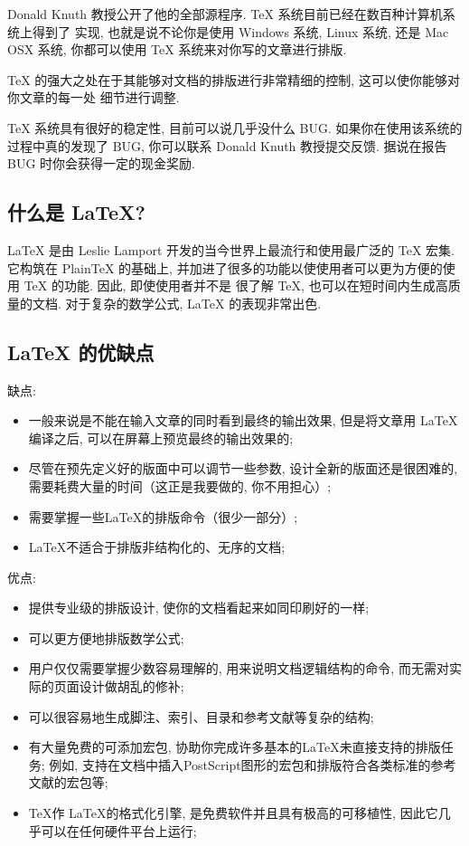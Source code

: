 \documentclass[bibsec, doctor]{cugthesis}
\begin{document}
    Donald Knuth 教授公开了他的全部源程序. \TeX{} 系统目前已经在数百种计算机系统上得到了
    实现, 也就是说不论你是使用 Windows 系统, Linux 系统, 还是 Mac OSX 系统, 你都可以使用
    \TeX{} 系统来对你写的文章进行排版. 

    \TeX{} 的强大之处在于其能够对文档的排版进行非常精细的控制, 这可以使你能够对你文章的每一处
    细节进行调整.

    \TeX{} 系统具有很好的稳定性, 目前可以说几乎没什么 BUG. 如果你在使用该系统的过程中真的发现了
    BUG, 你可以联系 Donald Knuth 教授提交反馈. 据说在报告 BUG 时你会获得一定的现金奖励.
\subsection{什么是 \LaTeX{}?}
\label{sec:sub_what_is_latex_}
    \LaTeX{} 是由 Leslie Lamport 开发的当今世界上最流行和使用最广泛的 \TeX{} 宏集. 它构筑在 PlainTeX
    的基础上, 并加进了很多的功能以使使用者可以更为方便的使用 \TeX{} 的功能. 因此, 即使使用者并不是
    很了解 \TeX{}, 也可以在短时间内生成高质量的文档. 对于复杂的数学公式, \LaTeX{} 的表现非常出色.

\subsection{\LaTeX{} 的优缺点}
\label{sec:sub_latex_advantages_disabvantages_}
缺点: 
\begin{itemize}
    \item 一般来说是不能在输入文章的同时看到最终的输出效果, 但是将文章用 \LaTeX{}编译之后, 可以在屏幕上预览最终的输出效果的; 
    \item 尽管在预先定义好的版面中可以调节一些参数, 设计全新的版面还是很困难的, 需要耗费大量的时间（这正是我要做的, 你不用担心）; 
    \item 需要掌握一些\LaTeX{}的排版命令（很少一部分）; 
    \item \LaTeX{}不适合于排版非结构化的、无序的文档; 
\end{itemize}

优点:
\begin{itemize}
    \item 提供专业级的排版设计, 使你的文档看起来如同印刷好的一样; 
    \item 可以更方便地排版数学公式; 
    \item 用户仅仅需要掌握少数容易理解的, 用来说明文档逻辑结构的命令, 而无需对实际的页面设计做胡乱的修补; 
    \item 可以很容易地生成脚注、索引、目录和参考文献等复杂的结构; 
    \item 有大量免费的可添加宏包, 协助你完成许多基本的LaTeX未直接支持的排版任务; 例如, 支持在文档中插入PostScript图形的宏包和排版符合各类标准的参考文献的宏包等; 
    \item \TeX{}作 \LaTeX{}的格式化引擎, 是免费软件并且具有极高的可移植性, 因此它几乎可以在任何硬件平台上运行; 
\end{itemize}
\end{document}
